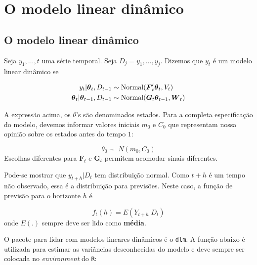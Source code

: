 \documentclass[
  letterpaper,
  DIV=11,
  numbers=noendperiod]{scrreprt}
\author{}
\date{}
\begin{document}
\ifdefined\Shaded\renewenvironment{Shaded}{\begin{tcolorbox}[interior hidden, sharp corners, boxrule=0pt, borderline west={3pt}{0pt}{shadecolor}, enhanced, frame hidden, breakable]}{\end{tcolorbox}}\fi

\hypertarget{o-modelo-linear-dinuxe2mico}{%
\chapter{O modelo linear dinâmico}\label{o-modelo-linear-dinuxe2mico}}

\hypertarget{o-modelo-linear-dinuxe2mico-1}{%
\section{O modelo linear dinâmico}\label{o-modelo-linear-dinuxe2mico-1}}

Seja \(y_1,\ldots,t\) uma série temporal. Seja \(D_j={y_1,\ldots,y_j}\).
Dizemos que \(y_t\) é um modelo linear dinâmico se

\[\begin{align}
y_t|\boldsymbol{\theta}_t,D_{t-1}&\sim\hbox{Normal}(\boldsymbol{F}_t'\boldsymbol{\theta}_t,V_t)\\
\boldsymbol{\theta}_t|\boldsymbol{\theta}_{t-1},D_{t-1}&\sim\hbox{Normal}(\boldsymbol{G}_t\boldsymbol{\theta}_{t-1},\boldsymbol{W}_t)
\end{align}\]

A expressão acima, os \(\theta\)'s são denominados estados. Para a
completa especificação do modelo, devemos informar valores iniciais
\(m_0\) e \(C_0\) que representam nossa opinião sobre os estados antes
do tempo \(1\):

\[\theta_0\sim\ N(m_0,C_0)\] Escolhas diferentes para
\(\boldsymbol{F}_t\) e \(\boldsymbol{G}_t\) permitem acomodar sinais
diferentes.

Pode-se mostrar que \(y_{t+h}|D_t\) tem distribuição normal. Como
\(t+h\) é um tempo não observado, essa é a distribuição para previsões.
Neste caso, a função de previsão para o horizonte \(h\) é

\[f_t(h)=E(Y_{t+h}|D_{t})\] onde \(E(.)\) sempre deve ser lido como
\textbf{média}.

O pacote para lidar com modelos lineares dinâmicos é o \texttt{dlm}. A
função abaixo é utilizada para estimar as variâncias desconhecidas do
modelo e deve sempre ser colocada no \emph{environment} do \texttt{R}:
\end{document}
